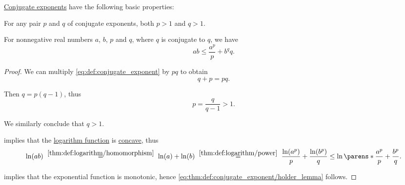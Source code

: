 \begin{proposition}\label{thm:def:conjugate_exponent}
  \hyperref[def:conjugate_exponent]{Conjugate exponents} have the following basic properties:
  \begin{thmenum}
     For any pair \( p \) and \( q \) of conjugate exponents, both \( p > 1 \) and \( q > 1 \).

     For nonnegative real numbers \( a \), \( b \), \( p \) and \( q \), where \( q \) is conjugate to \( q \), we have
    \begin{equation}\label{eq:thm:def:conjugate_exponent/holder_lemma}
      ab \leq \frac {a^p} p + {b^q} q.
    \end{equation}
  \end{thmenum}
\end{proposition}
\begin{proof}
   We can multiply \eqref{eq:def:conjugate_exponent} by \( pq \) to obtain
  \begin{equation*}
    q + p = pq.
  \end{equation*}

  Then \( q = p(q - 1) \), thus
  \begin{equation*}
    p = \frac q {q - 1} > 1.
  \end{equation*}

  We similarly conclude that \( q > 1 \).

    implies that the \hyperref[def:logarithm]{logarithm function} is \hyperref[def:convex_function]{concave}, thus
  \begin{equation*}
    \ln(ab)
    \reloset {\ref{thm:def:logarithm/homomorphism}} =
    \ln(a) + \ln(b)
    \reloset {\ref{thm:def:logarithm/power}} =
    \frac {\ln(a^p)} p + \frac {\ln(b^p)} q
    \leq
    \ln\parens*{ \frac {a^p} p + \frac {b^p} q }.
  \end{equation*}

   implies that the exponential function is monotonic, hence \eqref{eq:thm:def:conjugate_exponent/holder_lemma} follows.
\end{proof}

